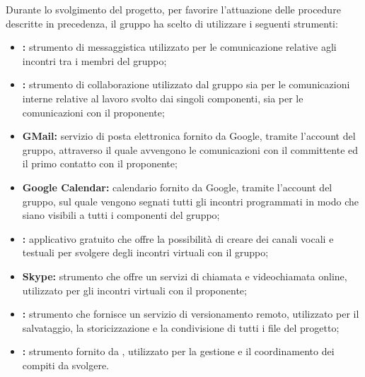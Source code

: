 		Durante lo svolgimento del progetto, per favorire l'attuazione delle procedure descritte in precedenza, il gruppo ha scelto di utilizzare i seguenti strumenti:
		\begin{itemize}
			\item \textbf{:} strumento di messaggistica utilizzato per le comunicazione relative agli incontri tra i membri del gruppo;
			\item \textbf{:} strumento di collaborazione utilizzato dal gruppo sia per le comunicazioni interne relative al lavoro svolto dai singoli componenti, sia per le comunicazioni con il proponente;
			\item \textbf{GMail:} servizio di posta elettronica fornito da Google, tramite l'account del gruppo, attraverso il quale avvengono le comunicazioni con il committente ed il primo contatto con il proponente;
			\item \textbf{Google Calendar:} calendario fornito da Google, tramite l'account del gruppo, sul quale vengono segnati tutti gli incontri programmati in modo che siano visibili a tutti i componenti del gruppo;
			\item \textbf{:} applicativo gratuito che offre la possibilità di creare dei canali vocali e testuali per svolgere degli incontri virtuali con il gruppo;
			\item \textbf{Skype:} strumento che offre un servizi di chiamata e videochiamata online, utilizzato per gli incontri virtuali con il proponente;
			\item \textbf{:} strumento che fornisce un servizio di versionamento remoto, utilizzato per il salvataggio, la storicizzazione e la condivisione di tutti i file del progetto;
			\item \textbf{:} strumento fornito da , utilizzato per la gestione e il coordinamento dei compiti da svolgere.
		\end{itemize}


